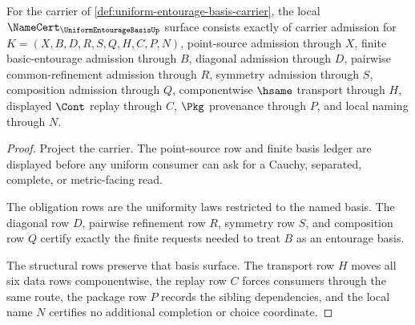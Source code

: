 \begin{theorem}
\label{thm:uniform-entourage-basis-namecert-obligations}
For the carrier of \autoref{def:uniform-entourage-basis-carrier}, the local $\NameCert_{\UniformEntourageBasisUp}$ surface consists exactly of carrier admission for $K=(X,B,D,R,S,Q,H,C,P,N)$, point-source admission through $X$, finite basic-entourage admission through $B$, diagonal admission through $D$, pairwise common-refinement admission through $R$, symmetry admission through $S$, composition admission through $Q$, componentwise $\hsame$ transport through $H$, displayed $\Cont$ replay through $C$, $\Pkg$ provenance through $P$, and local naming through $N$.
\end{theorem}
\begin{proof}
Project the carrier. The point-source row and finite basis ledger are displayed before any uniform consumer can ask for a Cauchy, separated, complete, or metric-facing read.

The obligation rows are the uniformity laws restricted to the named basis. The diagonal row $D$, pairwise refinement row $R$, symmetry row $S$, and composition row $Q$ certify exactly the finite requests needed to treat $B$ as an entourage basis.

The structural rows preserve that basis surface. The transport row $H$ moves all six data rows componentwise, the replay row $C$ forces consumers through the same route, the package row $P$ records the sibling dependencies, and the local name $N$ certifies no additional completion or choice coordinate.
\end{proof}


